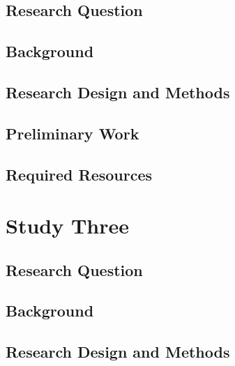 \documentclass[letterpaper]{tandon_thesis}
\begin{document}
\section{Research Question}\label{sec:ChapTwoIntroduction}


\section{Background}\label{sec:ChapTwoMotivation}


\section{Research Design and Methods}\label{sec:ChapTwoMethod}


\section{Preliminary Work}\label{sec:ChapTwoResults}


\section{Required Resources}\label{sec:ChapTwoDiscussion}



\chapter{Study Three}
\label{ch-3}

\section{Research Question}\label{sec:ChapThreeIntroduction}


\section{Background}\label{sec:ChapThreeMotivation}


\section{Research Design and Methods}\label{sec:ChapThreeMethod}

\end{document}
